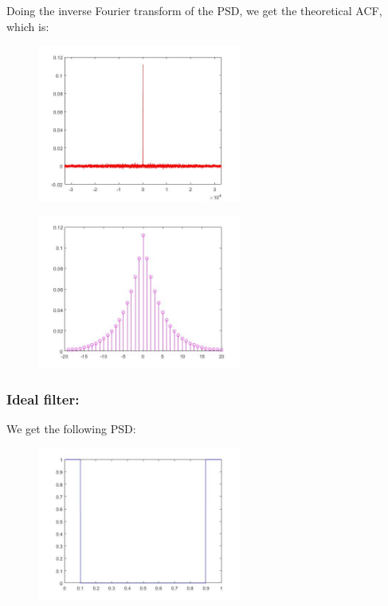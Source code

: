 \documentclass[a4paper,11pt]{article}
\begin{document}
Doing the inverse Fourier transform of the PSD, we get the theoretical ACF, which is:

\begin{figure}[!hp]
    \begin{center}
    \includegraphics[width=0.6\textwidth]{images/lab2_figure20.jpg}
    \end{center}
\end{figure}

\newpage

\begin{figure}[!hp]
    \begin{center}
    \includegraphics[width=0.6\textwidth]{images/lab2_figure4.jpg}
    \end{center}
\end{figure}

\newpage

\subsubsection{Ideal filter:}

We get the following PSD:

\begin{figure}[!hp]
    \begin{center}
    \includegraphics[width=0.6\textwidth]{images/lab3_figure9_1.jpg}
    \end{center}
\end{figure}
\end{document}

